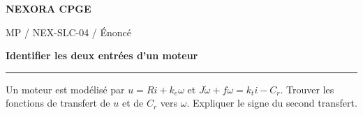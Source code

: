 \documentclass[11pt,a4paper]{article}
\begin{document}
{\small\bfseries\color{nexorablue} NEXORA CPGE}\par
{\small MP / NEX-SLC-04 / Énoncé}\par
{\LARGE\bfseries Identifier les deux entrées d’un moteur}\par
\vspace{0.25em}\hrule\vspace{0.6em}

Un moteur est modélisé par $u=Ri+k_e\omega$ et $J\dot\omega+f\omega=k_ti-C_r$. Trouver les fonctions de transfert de $u$ et de $C_r$ vers $\omega$. Expliquer le signe du second transfert.
\end{document}
